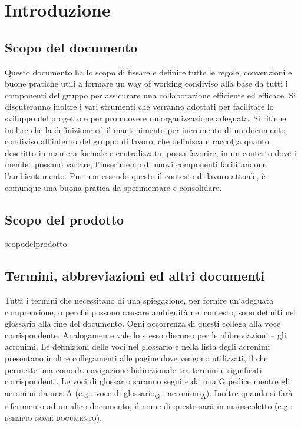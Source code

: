 \section{Introduzione}
\subsection{Scopo del documento}
    Questo documento ha lo scopo di fissare e definire tutte le regole, convenzioni e buone pratiche utili a formare un way of working condiviso alla base da tutti i componenti del gruppo per assicurare una collaborazione efficiente ed efficace. Si discuteranno inoltre i vari strumenti che verranno adottati per facilitare lo sviluppo del progetto e per promuovere un'organizzazione adeguata.
    Si ritiene inoltre che la definizione ed il mantenimento per incremento di un documento condiviso all'interno del gruppo di lavoro, che definisca e raccolga quanto descritto in maniera formale e centralizzata, possa favorire, in un contesto dove i membri possano variare, l'inserimento di nuovi componenti facilitandone l'ambientamento. Pur non essendo questo il contesto di lavoro attuale, è comunque una buona pratica da sperimentare e consolidare.

\subsection{Scopo del prodotto}
    scopodelprodotto

\subsection{Termini, abbreviazioni ed altri documenti}
    Tutti i termini che necessitano di una spiegazione, per fornire un'adeguata comprensione, o perché possono causare ambiguità nel contesto, sono definiti nel glossario alla fine del documento. Ogni occorrenza di questi collega alla voce corrispondente. Analogamente vale lo stesso discorso per le abbreviazioni e gli acronimi. Le definizioni delle voci nel glossario e nella lista degli acronimi presentano inoltre collegamenti alle pagine dove vengono utilizzati, il che permette una comoda navigazione bidirezionale tra termini e significati corrispondenti. Le voci di glossario saranno seguite da una G pedice mentre gli acronimi da una A (e.g.: voce di glossario\textsubscript{G} ; acronimo\textsubscript{A}).
    Inoltre quando si farà riferimento ad un altro documento, il nome di questo sarà in maiuscoletto (e.g.: \textsc{esempio nome documento}).

